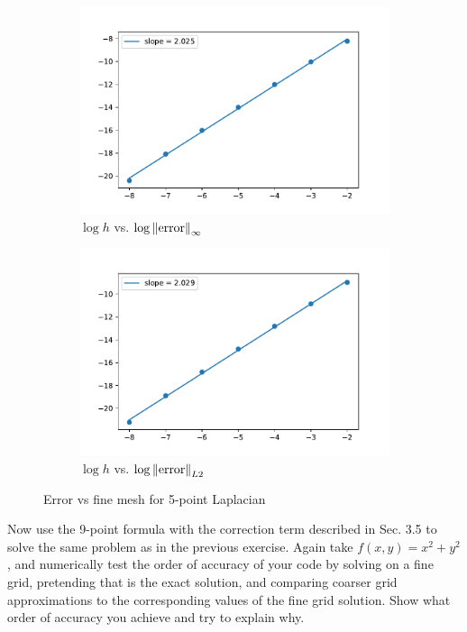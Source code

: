 \documentclass[10pt]{article}
\begin{document}
\begin{solution}[Solution]
    \begin{figure}[H]\centering
    \begin{subfigure}{.48\textwidth}
        \includegraphics[width=\textwidth]{img/1/error_inf.pdf}
        \caption{\(\log h\) vs. \( \log\left\lVert\text{error}\right\rVert_\infty \)}
    \end{subfigure}
    \begin{subfigure}{.48\textwidth}
        \includegraphics[width=\textwidth]{img/1/error_2.pdf}
        \caption{\(\log h\) vs. \( \log\left\lVert\text{error}\right\rVert_{L2} \)}
    \end{subfigure}
\caption{Error vs fine mesh for 5-point Laplacian}
\label{5pt}
\end{figure}


\end{solution}

\begin{problem}[Problem 2]
Now use the 9-point formula with the correction term described in Sec. 3.5 to solve
the same problem as in the previous exercise.
Again take \( f(x,y) = x^2 + y^2 \), and numerically test the order of accuracy of your code
by solving on a fine grid, pretending that is the exact solution, and comparing 
coarser grid approximations to the corresponding values of the fine grid solution.
Show what order of accuracy you achieve and try to explain why.
\end{problem}
\end{document}
